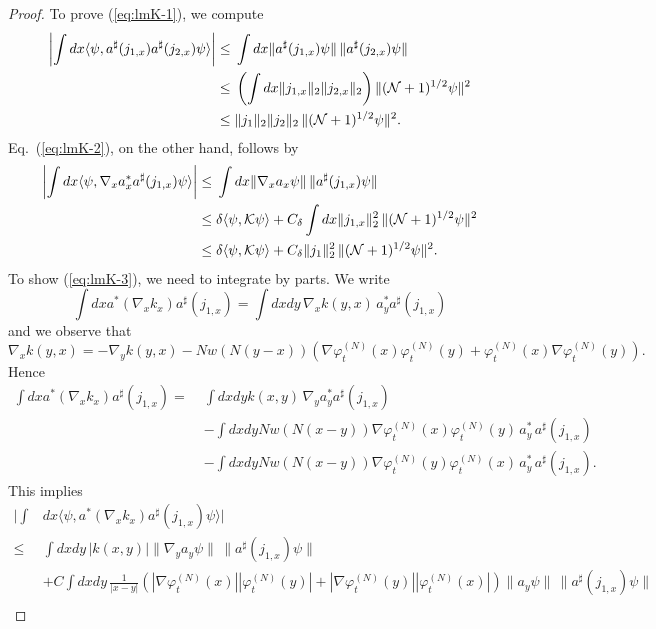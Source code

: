 \documentclass[11pt,a4paper]{article}
\newcommand{\cK}{{\cal K}}
\newcommand{\cN}{{\cal N}}
\begin{document}
\begin{proof}
To prove (\ref{eq:lmK-1}), we compute
\[ \begin{split}  \left| \int dx \langle \psi , a^\sharp (j_{1,x}) a^\sharp (j_{2,x}) \psi \rangle \right|  \leq  \; &\int dx \| a^\sharp (j_{1,x}) \psi \| \, \| a^\sharp (j_{2,x}) \psi \| \\ \leq \; &\left(\int dx \| j_{1,x} \|_2 \| j_{2,x} \|_2\right) \| (\cN+1)^{1/2} \psi \|^2 \\ \leq \; &\| j_1 \|_2 \| j_2 \|_2  \, \| (\cN+1)^{1/2} \psi \|^2. \end{split} \]
Eq.\ (\ref{eq:lmK-2}), on the other hand, follows by
\begin{equation} \begin{split}
\left| \int dx \langle \psi, \nabla_x a_x^* a^\sharp (j_{1,x}) \psi \rangle \right| \leq \; & \int dx \| \nabla_x a_x \psi \| \, \| a^\sharp (j_{1,x}) \psi \| \\ \leq \; &\delta \langle \psi, \cK \psi \rangle + C_\delta  \int dx \| j_{1,x} \|_2^2 \, \| (\cN+1)^{1/2} \psi \|^2 \\ \leq \; & \delta \langle \psi , \cK \psi \rangle + C_\delta \| j_1 \|^2_2 \, \| (\cN+1)^{1/2} \psi \|^2. \end{split} \end{equation}
To show (\ref{eq:lmK-3}), we need to integrate by parts. We write
\[ \int dx a^* (\nabla_x k_x) a^\sharp (j_{1,x})  = \int dx dy \, \nabla_x k (y,x) \, a^*_y  a^\sharp (j_{1,x}) \]
and we observe that
\[ \nabla_x k(y,x) = - \nabla_y k(y,x) - N w (N (y-x)) \left( \nabla
\varphi^{(N)}_t (x) \varphi^{(N)}_t (y) + \varphi_t^{(N)} (x) \nabla
\varphi_t^{(N)} (y) \right). \]
Hence
\[\begin{split} 
 \int dx a^* (\nabla_x k_x) a^\sharp (j_{1,x}) = \; & \int dx dy k (x,y) \, \nabla_y a^*_y  a^\sharp (j_{1,x}) 
\\ &- \int dx dy N w (N (x-y)) \nabla \varphi_t^{(N)} (x) \varphi_t^{(N)} (y) \, a^*_y  \, a^\sharp(j_{1,x})
\\& - \int dx dy N w (N (x-y)) \nabla \varphi_t^{(N)} (y) \varphi_t^{(N)} (x) \, a^*_y  \, a^\sharp(j_{1,x}).\end{split} \]
This implies
\[ \begin{split}  \Big|  \int &dx \langle \psi,   a^* (\nabla_x k_x) a^\sharp (j_{1,x}) \psi \rangle \Big| \\ \leq \; & \int dx dy \, |k(x,y)| \| \nabla_y a_y \psi \| \, \| a^\sharp (j_{1,x}) \psi \| \\ &+ C \int dx dy \,  \frac{1}{|x-y|}  \left( |\nabla \varphi_t^{(N)} (x)| |\varphi^{(N)}_t (y)| +|\nabla \varphi_t^{(N)} (y)| |\varphi^{(N)}_t (x)| \right) \| a_y \psi \| \, \| a^\sharp (j_{1,x}) \psi \|  \\ 

\end{split}\]
\end{proof}
\end{document}
